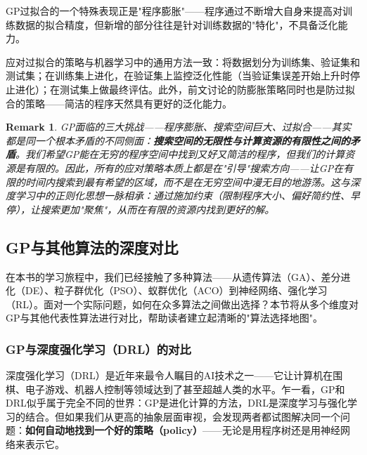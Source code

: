 \documentclass[lang=cn,zihao=-4,a4paper,fontset=windows]{beautybook}
\newtheorem*{remark}{\textbf{Remark}}
\begin{document}
GP过拟合的一个特殊表现正是"程序膨胀"——程序通过不断增大自身来提高对训练数据的拟合精度，但新增的部分往往是针对训练数据的"特化"，不具备泛化能力。

应对过拟合的策略与机器学习中的通用方法一致：将数据划分为训练集、验证集和测试集；在训练集上进化，在验证集上监控泛化性能（当验证集误差开始上升时停止进化）；在测试集上做最终评估。此外，前文讨论的防膨胀策略同时也是防过拟合的策略——简洁的程序天然具有更好的泛化能力。

\begin{remark}
GP面临的三大挑战——程序膨胀、搜索空间巨大、过拟合——其实都是同一个根本矛盾的不同侧面：\textbf{搜索空间的无限性与计算资源的有限性之间的矛盾}。我们希望GP能在无穷的程序空间中找到又好又简洁的程序，但我们的计算资源是有限的。因此，所有的应对策略本质上都是在"引导"搜索方向——让GP在有限的时间内搜索到最有希望的区域，而不是在无穷空间中漫无目的地游荡。这与深度学习中的正则化思想一脉相承：通过施加约束（限制程序大小、偏好简约性、早停），让搜索更加"聚焦"，从而在有限的资源内找到更好的解。
\end{remark}

\subsection{GP与其他算法的深度对比}

在本书的学习旅程中，我们已经接触了多种算法——从遗传算法（GA）、差分进化（DE）、粒子群优化（PSO）、蚁群优化（ACO）到神经网络、强化学习（RL）。面对一个实际问题，如何在众多算法之间做出选择？本节将从多个维度对GP与其他代表性算法进行对比，帮助读者建立起清晰的"算法选择地图"。

\subsubsection{GP与深度强化学习（DRL）的对比}

深度强化学习（DRL）是近年来最令人瞩目的AI技术之一——它让计算机在围棋、电子游戏、机器人控制等领域达到了甚至超越人类的水平。乍一看，GP和DRL似乎属于完全不同的世界：GP是进化计算的方法，DRL是深度学习与强化学习的结合。但如果我们从更高的抽象层面审视，会发现两者都试图解决同一个问题：\textbf{如何自动地找到一个好的策略（policy）}——无论是用程序树还是用神经网络来表示它。
\end{document}
